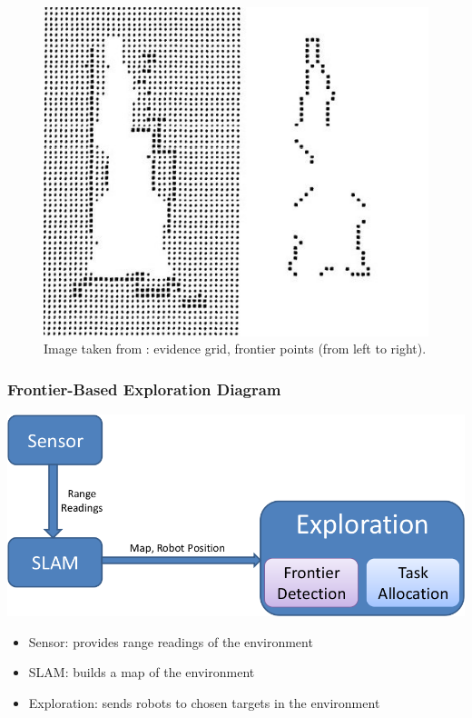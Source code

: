 \begin{frame}
\begin{figure}
 \centering
 \includegraphics[width=0.6\columnwidth,keepaspectratio]{images/frontiers_example_only_frontiers.jpg}
 \caption{Image taken from \citep{yamauchi_frontier-based_1998}: evidence
 grid, frontier points (from left to right).}
\end{figure}
\end{frame}

\begin{frame}
\frametitle{Frontier-Based Exploration Diagram}
\centering
\includegraphics[width=0.8\columnwidth,keepaspectratio]{images/exploration_diagram.png}
\begin{itemize}
  \item Sensor: provides range readings of the environment
  \item SLAM: builds a map of the environment
  \item Exploration: sends robots to chosen targets in the environment 
\end{itemize}
\end{frame}

